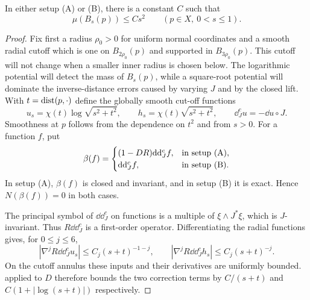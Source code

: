 \begin{lemma}\label{lem:quadratic-mass}
In either setup \textup{(A)} or \textup{(B)}, there is a constant $C$
such that
\begin{equation}\label{eq:current-quadratic-mass}
 \mu(B_s(p))\le Cs^2\qquad(p\in X,\ 0<s\le1).
\end{equation}
\end{lemma}

\begin{proof}
Fix first a radius $\rho_0>0$ for uniform normal coordinates and a smooth
radial cutoff which is one on $B_{2\rho_0}(p)$ and supported in
$B_{3\rho_0}(p)$.  This cutoff will not change when a smaller inner
radius is chosen below. The logarithmic potential will detect the mass
of $B_s(p)$, while a square-root potential will dominate the
inverse-distance errors caused by varying $J$ and by the closed lift.
With $t=\operatorname{dist}(p,\cdot)$ define the globally
smooth cut-off functions
\[
 u_s=\chi(t)\log\sqrt{s^2+t^2},\qquad
 h_s=\chi(t)\sqrt{s^2+t^2},\qquad
 \dd_J^cu=-\dd u\circ J.
\]
Smoothness at $p$ follows from the dependence on $t^2$ and from $s>0$.
For a function $f$, put
\[
 \beta(f)=
 \begin{cases}
  (1-DR)\mathrm d\mathrm d_J^cf,&\text{in setup \textup{(A)}},\\
  \mathrm d\mathrm d_J^cf,&\text{in setup \textup{(B)}}.
 \end{cases}
\]
In setup \textup{(A)}, $\beta(f)$ is closed and invariant, and in setup
\textup{(B)} it is exact.  Hence $N(\beta(f))=0$ in both cases.

The principal symbol of $\dd\dd_J^c$ on functions is a multiple of
$\xi\wedge J^*\xi$, which is $J$-invariant.  Thus
$R\dd\dd_J^c$ is a first-order operator.  Differentiating the radial
functions gives, for $0\le j\le6$,
\[
 |\nabla^jR\dd\dd_J^cu_s|\le C_j(s+t)^{-1-j},\qquad
 |\nabla^jR\dd\dd_J^ch_s|\le C_j(s+t)^{-j}.
\]
On the cutoff annulus these inputs and their derivatives are uniformly
bounded.   applied to $D$ therefore
bounds the two correction terms by
$C/(s+t)$ and $C(1+|\log(s+t)|)$ respectively.


\end{proof}
